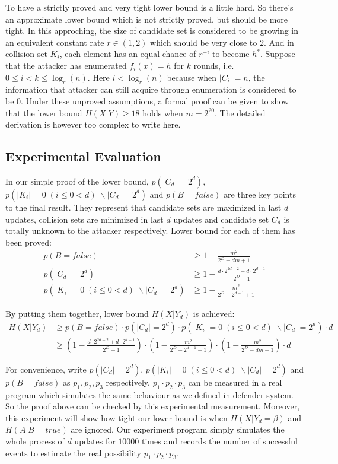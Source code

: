 \documentclass[10pt,a4paper]{article}
\begin{document}
		To have a strictly proved and very tight lower bound
		is a little hard.
		So there's an approximate lower bound which is not
		strictly proved, but should be more tight.
		In this approching,
		the size of candidate set is
		considered to be growing in an equivalent
		constant rate $r \in (1, 2)$ which
		should be very close to $2$.
		And in collision set $K_i$, each
		element has an equal chance of
		$r^{-i}$ to become $h^*$.
		Suppose that the attacker
		has enumerated $f_i(x) = h$
		for $k$ rounds, i.e. $0 \leq i < k \leq \log_r(n)$. Here
		$i < \log_r(n)$ because when
		$|C_i| = n$, the information that
		attacker can still acquire through
		enumeration is considered to be $0$.
		Under these unproved assumptions,
		a formal proof can be given to show that the lower bound
		$H(X | Y) \geq 18$ holds when $m = 2^{20}$. 
		The detailed derivation is however too complex
		to write here.
		
	\subsection{Experimental Evaluation}
		In our simple proof of the lower bound, $p(|C_d| = 2^d)$,
		$p(|K_i| = 0 \; (i \leq 0 < d) \; \backslash |C_d| = 2^d)$ and $p(B = false)$ are 
		three key points to the final result.
		They represent that candidate sets are maximized in
		last $d$ updates, collision sets are minimized in
		last $d$ updates and candidate set $C_d$ is totally unknown
		to the attacker respectively.
		Lower bound for each of them has been proved:
		\begin{align*}
			p(B = false) &\geq 1-\frac{m^2}{2^D-dm+1}\\
			p(|C_d| = 2^d) &\geq 1-\frac{d \cdot 2^{2d-2}+d \cdot 2^{d-1}}{2^D-1}\\
			p(|K_i| = 0 \; (i \leq 0 < d) \; \backslash |C_d| = 2^d) &\geq 1-\frac{m^2}{2^D-2^{d-1}+1}
		\end{align*}
		
		By putting them together, lower bound $H(X | Y_d)$ is achieved:
		\begin{align*}
			H(X | Y_d) &\geq p(B = false) \cdot p(|C_d| = 2^d) \cdot 
				p(|K_i| = 0 \; (i \leq 0 < d) \; \backslash |C_d| = 2^d) \cdot d\\
				&\geq (1-\frac{d \cdot 2^{2d-2}+d \cdot 2^{d-1}}{2^D-1})
					\cdot (1-\frac{m^2}{2^D-2^{d-1}+1}) 
					\cdot (1-\frac{m^2}{2^D-dm+1}) \cdot d 
		\end{align*}
		
		For convenience, write $p(|C_d| = 2^d)$,
		$p(|K_i| = 0 \; (i \leq 0 < d) \; \backslash |C_d| = 2^d)$ and $p(B = false)$
		as $p_1, p_2, p_3$ respectively. 
		$p_1 \cdot p_2 \cdot p_3$ can be measured in a real program which 
		simulates the same behaviour as we defined in defender system.
		So the proof above can be checked by this experimental measurement.
		Moreover, this experiment will show how tight our lower bound is
		when $H(X | Y_d = \beta)$ and $H(A | B = true)$ are ignored.
		Our experiment program simply simulates the whole process of $d$ updates
		for $10000$ times and records the number of successful events
		to estimate the real possibility $p_1 \cdot p_2 \cdot p_3$.
		
\end{document}
